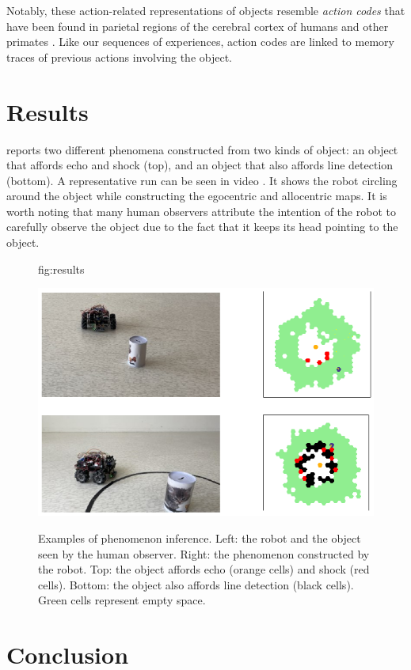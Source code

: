 \documentclass[pmlr]{jmlr}%
\begin{document}
Notably, these action-related representations of objects resemble \textit{action codes} that have been found in parietal regions of the cerebral cortex of humans and other primates \citep{chao_representation_2000,colby_space_1999, schubotz_objects_2014}. 
Like our sequences of experiences, action codes are linked to memory traces of previous actions involving the object.


\section{Results}

 reports two different phenomena constructed from two kinds of object: an object that affords echo and shock (top), and an object that also affords line detection (bottom).
A representative run can be seen in video \citep{titouan_knockaert_demonstration_2022}.
It shows the robot circling around the object while constructing the egocentric and allocentric maps. 
It is worth noting that many human observers attribute the intention of the robot to carefully observe the object due to the fact that it keeps its head pointing to the object. 

\begin{figure}[htbp]
	\floatconts
	{fig:results}
	{\caption{Examples of phenomenon inference.
			  Left: the robot and the object seen by the human observer.
			  Right: the phenomenon constructed by the robot. 
			  Top: the object affords echo (orange cells) and shock (red cells). 
			  Bottom: the object also affords line detection (black cells). 
			  Green cells represent empty space.}}
	{\includegraphics[width=0.6\linewidth]{images/Figure_3_results}}
\end{figure}


\section{Conclusion}
\end{document}
